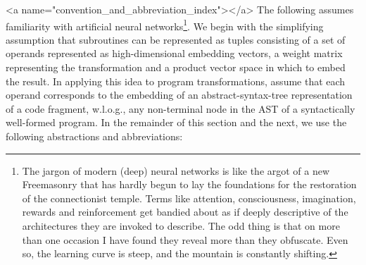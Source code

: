 \rawhtml
<a name="convention_and_abbreviation_index"></a>
\endrawhtml
The following assumes familiarity with artificial neural networks\footnote{%
%
  The jargon of modern (deep) neural networks is like the argot of a new Freemasonry that has hardly begun to lay the foundations for the restoration of the connectionist temple. Terms like attention, consciousness, imagination, rewards and reinforcement get bandied about as if deeply descriptive of the architectures they are invoked to describe. The odd thing is that on more than one occasion I have found they reveal more than they obfuscate. Even so, the learning curve is steep, and the mountain is constantly shifting.}. 
%
We begin with the simplifying assumption that subroutines can be represented as tuples consisting of a set of operands represented as high-dimensional embedding vectors, a weight matrix representing the transformation and a product vector space in which to embed the result. In applying this idea to program transformations, assume that each operand corresponds to the embedding of an abstract-syntax-tree representation of a code fragment, w.l.o.g., any non-terminal node in the AST of a syntactically well-formed program. In the remainder of this section and the next, we use the following abstractions and abbreviations:
%
